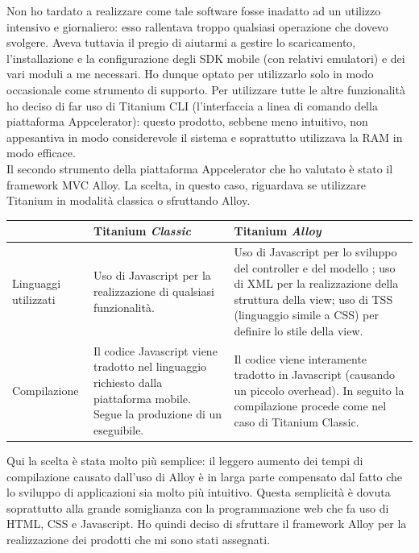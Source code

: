				Non ho tardato a realizzare come tale software fosse inadatto ad un utilizzo intensivo e giornaliero: esso rallentava
				troppo qualsiasi operazione che dovevo svolgere. Aveva tuttavia il pregio di aiutarmi a gestire lo scaricamento,
				l'installazione e la configurazione degli SDK mobile (con relativi emulatori) e dei vari moduli a me necessari. Ho
				dunque optato per utilizzarlo solo in modo occasionale come strumento di supporto. Per utilizzare tutte le altre
				funzionalità ho deciso di far uso di Titanium CLI (l'interfaccia a linea di comando della piattaforma Appcelerator):
				questo prodotto, sebbene meno intuitivo, non appesantiva in modo considerevole il sistema e soprattutto utilizzava la
				RAM in modo efficace.\\
				Il secondo strumento della piattaforma Appcelerator che ho valutato è stato il framework MVC Alloy. La scelta, in
				questo caso, riguardava se utilizzare Titanium in modalità classica o sfruttando Alloy.
				\begin{center}
					\begin{tabular}[H]{| p{} | p{0.35\textwidth} | p{} |}
						\hline
						&
						Titanium \emph{Classic}&
						Titanium \emph{Alloy}\\
						\hline\hline
						Linguaggi utilizzati &
						Uso di Javascript per la realizzazione di qualsiasi funzionalità. &
						Uso di Javascript per lo sviluppo del controller e del modello ; uso di XML per la realizzazione
						della struttura della view; uso di TSS (linguaggio simile a CSS) per definire lo stile della view.\\
						\hline
						Compilazione &
						Il codice Javascript viene tradotto nel linguaggio richiesto dalla piattaforma mobile. Segue la
						produzione di un eseguibile. &
						Il codice viene interamente tradotto in Javascript (causando un piccolo overhead). In seguito la
						compilazione procede come nel caso di Titanium Classic.\\
						\hline
					\end{tabular}
				\end{center}
				Qui la scelta è	stata molto più semplice: il leggero aumento dei tempi di compilazione causato dall'uso di Alloy
				è in larga parte compensato dal fatto che lo sviluppo di applicazioni sia molto più intuitivo. Questa semplicità è
				dovuta soprattutto alla grande somiglianza con la programmazione web che fa uso di HTML, CSS e Javascript. Ho quindi
				deciso di sfruttare il framework Alloy per la realizzazione dei prodotti che mi sono stati assegnati.\\
